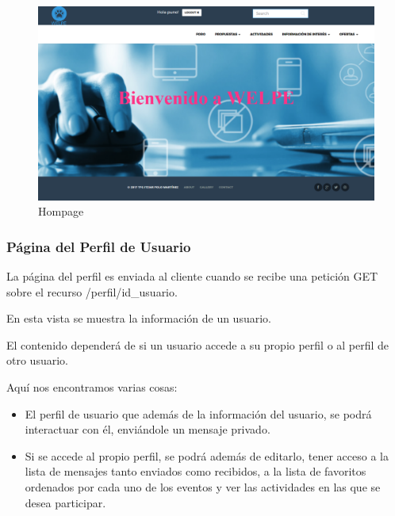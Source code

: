  \begin{figure}[H]
    \centering
    \includegraphics[width=12cm]{img/home}
    \caption{Hompage}
    \label{figura:home}
 \end{figure}
 
 
\subsubsection{Página del Perfil de Usuario}
\label{subsubsec:profile}

La página del perfil es enviada al cliente cuando se recibe una petición GET sobre el recurso /perfil/{id\_usuario}.


En esta vista se muestra la información de un usuario.


El contenido dependerá de si un usuario accede a su propio perfil o al perfil de otro usuario.


Aquí nos encontramos varias cosas:

\begin{itemize}
\item El perfil de usuario que además de la información del usuario, se podrá interactuar con él, enviándole un mensaje privado.
\item Si se accede al propio perfil, se podrá además de editarlo, tener acceso a la lista de mensajes tanto enviados como recibidos, a la lista de favoritos ordenados por cada uno de los eventos y ver las actividades en las que se desea participar.
\end{itemize}

